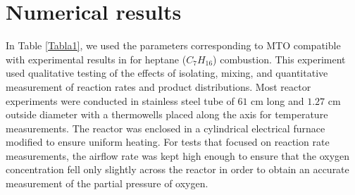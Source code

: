 \section{Numerical results}

In Table \ref{Tabla1}, we used the parameters corresponding to MTO compatible with experimental results in \cite{freitag2005low} for heptane ($C_7H_{16}$) combustion.
This experiment used qualitative testing of the effects of isolating, mixing, and quantitative measurement of reaction rates and product distributions.
Most reactor experiments were conducted in stainless steel tube of $61$ cm long and $1.27$ cm outside diameter with a thermowells placed along the axis for temperature measurements.
The reactor was enclosed in a cylindrical electrical furnace modified to ensure uniform heating.
For tests that focused on reaction rate measurements, the airflow rate was kept high enough to ensure that the oxygen concentration fell only slightly across the reactor in order to obtain an accurate measurement of the partial pressure of oxygen.


